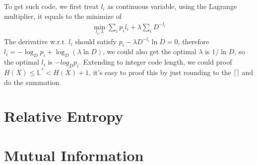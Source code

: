 \documentclass[12pt]{article}
\begin{document}
To get such code, we first treat $l_i$ as continuous variable, using the Lagrange multiplier, it equals to the minimize of 
\begin{eqnarray}
	\min_{l_i,\lambda} \sum_i p_il_i + \lambda \sum_i D^{-l_i}
\end{eqnarray}
The derivative w.r.t. $l_i$ should satisfy $p_i-\lambda D^{-l_i}\ln D=0$, therefore $l_i=-\log_D p_i + \log_D (\lambda\ln D)$, we could also get the optimal $\lambda$ is $1/\ln D$, so the optimal $l_i$ is $-log_D p_i$. Extending to integer code length, we could proof $H(X) \le \mathbb{L}^* < H(X) + 1$, it's easy to proof this by just rounding to the $\lceil \rceil$ and do the summation.

\section{Relative Entropy}

\section{Mutual Information}
\end{document}
